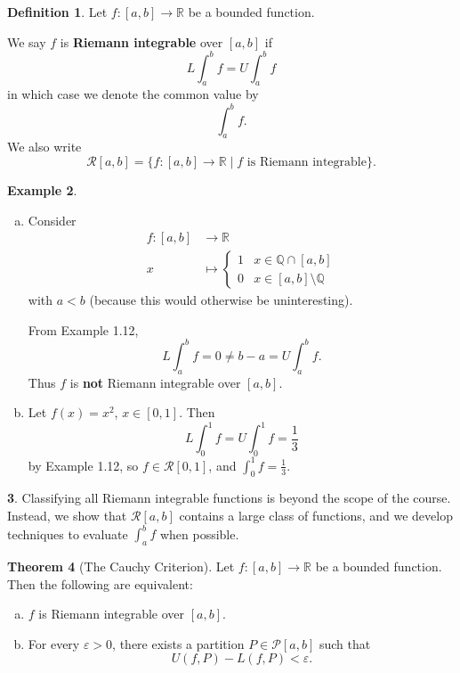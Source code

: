 \documentclass[11pt]{article}
\theoremstyle{definition}
\newtheorem{thm}{Theorem}[section]
\newtheorem{defn}[thm]{Definition}
\newtheorem{exmp}[thm]{Example}
\newtheorem{none}[thm]{}
\newcommand{\mbQ}{\ensuremath{\mathbb{Q}}}
\newcommand{\mbR}{\ensuremath{\mathbb{R}}}
\begin{document}
\begin{defn}
Let $f : [a, b] \to \mbR$ be a bounded function. 

We say $f$ is \textbf{Riemann integrable} over $[a, b]$ if
$$L\int_a^b f = U\int_a^b f$$
in which case we denote the common value by
$$\int_a^b f \text{.}$$
We also write
$$\mathcal{R}[a, b] = \{f : [a, b] \to \mbR \mid f \text{ is Riemann integrable}\} \text{.}$$
\end{defn}

\begin{exmp}~ \vspace{-0.2cm}
\begin{enumerate}[(a)]

\item Consider 
\begin{align*}
f : [a, b] & \to \mbR \\
          x & \mapsto \begin{cases}
          				1 & x \in \mbQ \cap [a, b] \\
          				0 & x \in [a, b] \setminus \mbQ
				   \end{cases}
\end{align*}
with $a < b$ (because this would otherwise be uninteresting). 

From Example 1.12,
$$L\int_a^b f = 0 \neq b - a = U\int_a^b f \text{.}$$
Thus $f$ is \textbf{not} Riemann integrable over $[a, b]$.

\item Let $f(x) = x^2$, $x \in [0, 1]$. Then
$$L\int_0^1 f = U\int_0^1 f = \frac13$$
by Example 1.12, so $f \in \mathcal{R}[0, 1]$, and $\int_0^1 f = \frac13$.

\end{enumerate}
\end{exmp}

\begin{none}
Classifying all Riemann integrable functions is beyond the scope of the course. Instead, we show that $\mathcal{R}[a, b]$ contains a large class of functions, and we develop techniques to evaluate $\int_a^b f$ when possible.
\end{none}

\begin{thm}[The Cauchy Criterion]
Let $f : [a, b] \to \mbR$ be a bounded function. Then the following are equivalent: \vspace{-0.2cm}
\begin{enumerate}[(a)]
\item $f$ is Riemann integrable over $[a, b]$. 
\item For every $\varepsilon > 0$, there exists a partition $P \in \mathcal{P}[a, b]$ such that
$$U(f, P) - L(f, P) < \varepsilon \text{.}$$
\end{enumerate}
\end{thm}
\end{document}
